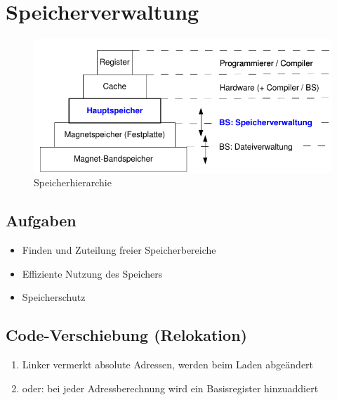 \section{Speicherverwaltung}
\begin{figure}[ht!]
    \includegraphics[scale=.5]{pics/memory}
    \caption{Speicherhierarchie}
\end{figure}

\subsection{Aufgaben}
\begin{itemize}
    \item Finden und Zuteilung freier Speicherbereiche
    \item Effiziente Nutzung des Speichers
    \item Speicherschutz
\end{itemize}

\subsection{Code-Verschiebung (Relokation)}
\begin{enumerate}
    \item Linker vermerkt absolute Adressen, werden beim Laden abgeändert
    \item oder: bei jeder Adressberechnung wird ein Basisregister hinzuaddiert
\end{enumerate}

\pagebreak

